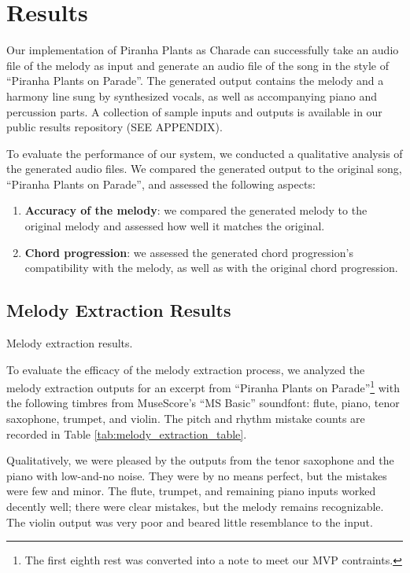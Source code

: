 \section{Results}
\label{sec:results}

Our implementation of Piranha Plants as Charade can successfully take an audio file of the melody as input and generate an audio file of the song in the style of ``Piranha Plants on Parade''. The generated output contains the melody and a harmony line sung by synthesized vocals, as well as accompanying piano and percussion parts. A collection of sample inputs and outputs is available in our public results repository (SEE APPENDIX).

To evaluate the performance of our system, we conducted a qualitative analysis of the generated audio files. We compared the generated output to the original song, ``Piranha Plants on Parade'', and assessed the following aspects:
\begin{enumerate}
    \item \textbf{Accuracy of the melody}: we compared the generated melody to the original melody and assessed how well it matches the original.
    \item \textbf{Chord progression}: we assessed the generated chord progression's compatibility with the melody, as well as with the original chord progression.
\end{enumerate}

\subsection{Melody Extraction Results}
\label{sec:melody_extraction_results}

\begin{table} %
	\caption{Melody extraction results.}
	\centering
	
	\label{tab:melody_extraction_table}
\end{table}
To evaluate the efficacy of the melody extraction process, we analyzed the melody extraction outputs for an excerpt from ``Piranha Plants on Parade''\footnote{The first eighth rest was converted into a note to meet our MVP contraints.} with the following timbres from MuseScore's ``MS Basic'' soundfont: flute, piano, tenor saxophone, trumpet, and violin. The pitch and rhythm mistake counts are recorded in Table \ref{tab:melody_extraction_table}.

Qualitatively, we were pleased by the outputs from the tenor saxophone and the piano with low-and-no noise. They were by no means perfect, but the mistakes were few and minor. The flute, trumpet, and remaining piano inputs worked decently well; there were clear mistakes, but the melody remains recognizable. The violin output was very poor and beared little resemblance to the input.


